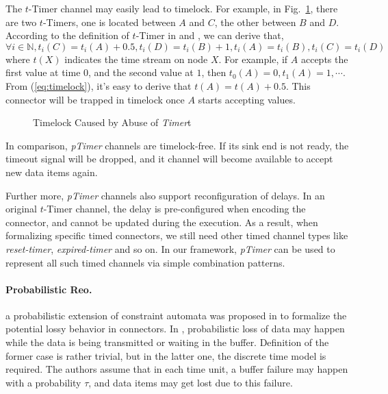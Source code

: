 \begin{example}
    The {$t$-Timer} channel may easily lead to timelock. For example, in Fig.~\ref{fig:timelock}, there are two {$t$-Timer}s, one is located between $A$ and $C$, the other between $B$ and $D$. According to the definition of {$t$-Timer} in \cite{Arbab2006} and \cite{Meng2012}, we can derive that,
\begin{equation}
        \forall i\in\mathbb{N}, t_i(C)=t_i(A)+0.5, t_i(D)=t_i(B)+1,t_i(A)=t_i(B), t_i(C)=t_i(D)
\label{eq:timelock}
\end{equation}
    where $t(X)$ indicates the time stream on node $X$. For example, if $A$ accepts the first value at time $0$, and the second value at $1$, then $t_0(A)=0,t_1(A)=1,\cdots$. From (\ref{eq:timelock}), it's easy to derive that $t(A) = t(A) + 0.5$. This connector will be trapped in timelock once $A$ starts accepting values.
    \begin{figure}[H]
        \centering
        
        \caption{Timelock Caused by Abuse of \emph{Timer}t}
        \label{fig:timelock}
    \end{figure}
\end{example}

In comparison, \emph{pTimer} channels are timelock-free. If its sink end is not ready, the timeout signal will be dropped, and it channel will become available to accept new data items again.

Further more, \emph{pTimer} channels also support reconfiguration of delays. In an original {$t$-Timer} channel, the delay is pre-configured when encoding the connector, and cannot be updated during the execution. As a result, when formalizing specific timed connectors, we still need other timed channel types like \emph{reset-timer}, \emph{expired-timer} and so on. In our framework, \emph{pTimer} can be used to represent all such timed channels via simple combination patterns.

\paragraph{Probabilistic Reo.}
a probabilistic extension of constraint automata was proposed in \cite{Models2005} to formalize the potential lossy behavior in connectors. In \cite{Models2005}, probabilistic loss of data may happen  while the data is being transmitted or waiting in the buffer. Definition of the former case is rather trivial, but in the latter one, the discrete time model is required. The authors assume that in each time unit, a buffer failure may happen with a probability $\tau$, and data items may get lost due to this failure.

